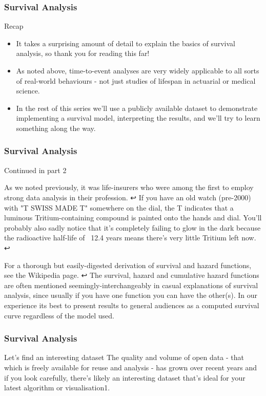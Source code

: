 	\begin{frame}
		\frametitle{Survival Analysis}
		Recap
		\begin{itemize}
			\item It takes a surprising amount of detail to explain the basics of survival analysis, so thank you for reading this far! 
			\item As noted above, time-to-event analyses are very widely applicable to all sorts of real-world behaviours - not just studies of lifespan in actuarial or medical science.
			
			\item 	In the rest of this series we'll use a publicly available dataset to demonstrate implementing a survival model, interpreting the results, and we'll try to learn something along the way. 
		\end{itemize}
		
	\end{frame}
	\begin{frame}
		\frametitle{Survival Analysis}
		Continued in part 2
		
		As we noted previously, it was life-insurers who were among the first to employ strong data analysis in their profession. ↩
		If you have an old watch (pre-2000) with "T SWISS MADE T" somewhere on the dial, the T indicates that a luminous Tritium-containing compound is painted onto the hands and dial. You'll probably also sadly notice that it's completely failing to glow in the dark because the radioactive half-life of ~12.4 years means there's very little Tritium left now. ↩
		
		For a thorough but easily-digested derivation of survival and hazard functions, see the Wikipedia page. ↩
		The survival, hazard and cumulative hazard functions are often mentioned seemingly-interchangeably in casual explanations of survival analysis, since usually if you have one function you can have the other(s). In our experience its best to present results to general audiences as a computed survival curve regardless of the model used.
		
	\end{frame}
	\begin{frame}
		\frametitle{Survival Analysis}
		
		Let's find an interesting dataset
		The quality and volume of open data - that which is freely available for reuse and analysis - has grown over recent years and if you look carefully, there's likely an interesting dataset that's ideal for your latest algorithm or visualisation1.
		
	\end{frame}
